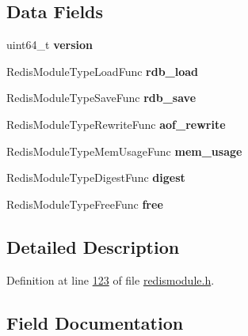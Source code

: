 \subsection*{Data Fields}
\begin{DoxyCompactItemize}
\item 
\mbox{\label{structRedisModuleTypeMethods_a4db2f9e662f4c899bb496edc27fa0434}} 
uint64\+\_\+t {\bfseries version}
\item 
\mbox{\label{structRedisModuleTypeMethods_a3fa03e5f9f21fb808e3116196fd9f66f}} 
Redis\+Module\+Type\+Load\+Func {\bfseries rdb\+\_\+load}
\item 
\mbox{\label{structRedisModuleTypeMethods_a928c30a5f09b76b3ee9bde0a5cf639d7}} 
Redis\+Module\+Type\+Save\+Func {\bfseries rdb\+\_\+save}
\item 
\mbox{\label{structRedisModuleTypeMethods_a1ef2a1edfe3468c69b36e8265245e287}} 
Redis\+Module\+Type\+Rewrite\+Func {\bfseries aof\+\_\+rewrite}
\item 
\mbox{\label{structRedisModuleTypeMethods_ade953bbc28d771768e1746544f04a0aa}} 
Redis\+Module\+Type\+Mem\+Usage\+Func {\bfseries mem\+\_\+usage}
\item 
\mbox{\label{structRedisModuleTypeMethods_a421c9f70ffc3c81d4c4018dcce340ac4}} 
Redis\+Module\+Type\+Digest\+Func {\bfseries digest}
\item 
\mbox{\label{structRedisModuleTypeMethods_a8ccb7d97db657d6b581df702b33681df}} 
Redis\+Module\+Type\+Free\+Func {\bfseries free}
\end{DoxyCompactItemize}


\subsection{Detailed Description}


Definition at line \hyperlink{redismodule_8h_source_l00123}{123} of file \hyperlink{redismodule_8h_source}{redismodule.\+h}.



\subsection{Field Documentation}
\mbox{\label{structRedisModuleTypeMethods_a1ef2a1edfe3468c69b36e8265245e287}} 
